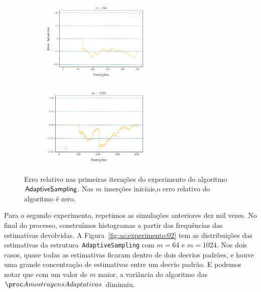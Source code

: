 \begin{figure}
  \centering
  \begin{subfigure}{.5\textwidth}
    \centering
    \includegraphics[width=\linewidth, height=4cm]{figuras/adaptive_sampling_erro_first_64.png}
  \end{subfigure}%
  \begin{subfigure}{.5\textwidth}
    \centering
    \includegraphics[width=\linewidth, height=4cm]{figuras/adaptive_sampling_erro_first_1024.png}
  \end{subfigure}
  \caption{Erro relativo nas primeiras iterações do experimento do algoritmo~$\textsf{AdaptiveSampling}$. Nas $m$ inserções iniciais,o erro 
  relativo do algoritmo é zero.}
  \label{fig:as:experimento:01:erro:first}
\end{figure}

Para o segundo experimento, repetimos as simulações anteriores dez mil vezes. No final do processo, construímos 
histogramas a partir das frequências das estimativas devolvidas. A Figura~\ref{fig:as:experimento:02} tem as 
distribuições das estimativas da estrutura~\texttt{AdaptiveSampling} com $m = 64$ e $m = 1024$. Nos dois casos, quase 
todas as estimativas ficaram dentro de dois desvios padrões, e houve uma grande concentração de estimativas entre um 
desvio padrão. E podemos notar que com um valor de $m$ maior, a variância do algoritmo das $\asampling$ diminuiu.

